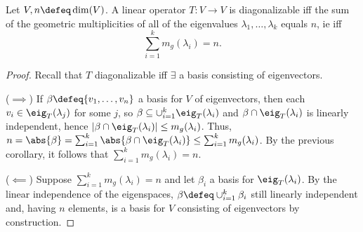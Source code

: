 \begin{theorem}
    Let $V, n \defeq \dim(V)$. A linear operator $T : V \to V$ is diagonalizable iff the sum of the geometric multiplicities of all of the eigenvalues $\lambda_1, \dots, \lambda_k$ equals $n$, ie iff \[
        \sum_{i=1}^k m_g(\lambda_i) = n.
    \]
\end{theorem}

\begin{proof}
    Recall that $T$ diagonalizable iff $\exists$ a basis consisting of eigenvectors. 

    ($\implies$) If $\beta \defeq \{v_1, \dots, v_n\}$ a basis for $V$ of eigenvectors, then each $v_i \in \eig_T(\lambda_j)$  for some $j$, so $\beta\subseteq \cup_{i=1}^k \eig_T(\lambda_i)$ and $\beta \cap \eig_T(\lambda_i)$ is linearly independent, hence $|\beta \cap \eig_T(\lambda_i)| \leq m_g(\lambda_i)$. Thus, $n = \abs{\beta} = \sum_{i=1}^k \abs{\beta \cap \eig_T(\lambda_i)} \leq \sum_{i=1}^k m_g(\lambda_i)$. By the previous corollary, it follows that $\sum_{i=1}^k m_g(\lambda_i) = n$.

    ($\impliedby$) Suppose $\sum_{i=1}^k m_g(\lambda_i) = n$ and let $\beta_i$ a basis for $\eig_T(\lambda_i)$. By the linear independence of the eigenspaces, $\beta \defeq \cup_{i=1}^k \beta_i$ still linearly independent and, having $n$ elements, is a basis for $V$ consisting of eigenvectors by construction.
\end{proof}

